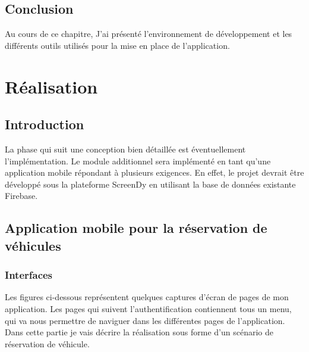 \documentclass[12pt,a4paper]{report}
\begin{document}
		\section{Conclusion}
Au cours de ce chapitre, J'ai présenté l’environnement de développement et les différents outils utilisés pour la mise en place de l’application.













	\chapter{Réalisation}

	\section{Introduction}
La phase qui suit une conception bien détaillée est éventuellement l’implémentation. Le module additionnel sera implémenté en tant qu’une application mobile répondant à plusieurs exigences. En effet, le projet devrait être développé sous la plateforme ScreenDy en utilisant la base de données existante Firebase.

	\section{Application mobile pour la réservation de véhicules}
	\subsection{Interfaces}
Les figures ci-dessous représentent quelques captures d’écran de pages de mon application. Les pages qui suivent l’authentification contiennent tous un menu, qui va nous permettre de naviguer dans les différentes pages de l'application.\\
Dans cette partie je vais décrire la réalisation sous forme d’un scénario de réservation de véhicule.
	\newpage
\end{document}
